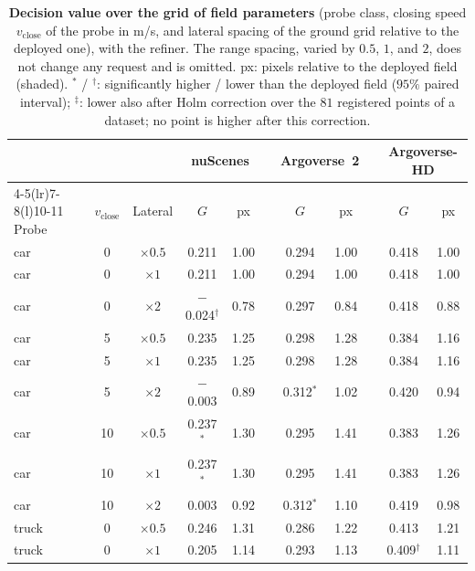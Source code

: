 \documentclass[10pt,letterpaper]{article}
\newcommand{\G}{G}
\newcommand{\vclose}{v_{\mathrm{close}}}
\newcommand{\oursrow}{\rowcolor{oursbg}}
\theoremstyle{remark}
\theoremstyle{plain}
\theoremstyle{definition}
\begin{document}
\begin{table}[!htbp]
\centering
\caption{\textbf{Decision value over the grid of field parameters} (probe class, closing speed $\vclose$ of the probe in m/s, and lateral spacing of the ground grid relative to the deployed one), with the refiner. The range spacing, varied by $0.5$, $1$, and $2$, does not change any request and is omitted. px: pixels relative to the deployed field (shaded). $^{\ast}$ / $^{\dagger}$: significantly higher / lower than the deployed field ($95\%$ paired interval); $^{\ddagger}$: lower also after Holm correction over the $81$ registered points of a dataset; no point is higher after this correction.}
\label{tab:grid}
\footnotesize
\setlength{\tabcolsep}{2.6pt}
\begin{tabular}{@{}lcccccccccc@{}}
\toprule
 & & & \multicolumn{2}{c}{nuScenes} & & \multicolumn{2}{c}{Argoverse~2} & & \multicolumn{2}{c}{Argoverse-HD} \\
\cmidrule(lr){4-5}\cmidrule(lr){7-8}\cmidrule(l){10-11}
Probe & $\vclose$ & Lateral & $\G$ & px & & $\G$ & px & & $\G$ & px \\
\midrule
car & 0 & $\times0.5$ & 0.211 & 1.00 & & 0.294 & 1.00 & & 0.418 & 1.00 \\
\oursrow car & 0 & $\times1$ & 0.211 & 1.00 & & 0.294 & 1.00 & & 0.418 & 1.00 \\
car & 0 & $\times2$ & $-$0.024$^{\dagger}$ & 0.78 & & 0.297 & 0.84 & & 0.418 & 0.88 \\
car & 5 & $\times0.5$ & 0.235 & 1.25 & & 0.298 & 1.28 & & 0.384 & 1.16 \\
car & 5 & $\times1$ & 0.235 & 1.25 & & 0.298 & 1.28 & & 0.384 & 1.16 \\
car & 5 & $\times2$ & $-$0.003 & 0.89 & & 0.312$^{\ast}$ & 1.02 & & 0.420 & 0.94 \\
car & 10 & $\times0.5$ & 0.237$^{\ast}$ & 1.30 & & 0.295 & 1.41 & & 0.383 & 1.26 \\
car & 10 & $\times1$ & 0.237$^{\ast}$ & 1.30 & & 0.295 & 1.41 & & 0.383 & 1.26 \\
car & 10 & $\times2$ & 0.003 & 0.92 & & 0.312$^{\ast}$ & 1.10 & & 0.419 & 0.98 \\
truck & 0 & $\times0.5$ & 0.246 & 1.31 & & 0.286 & 1.22 & & 0.413 & 1.21 \\
truck & 0 & $\times1$ & 0.205 & 1.14 & & 0.293 & 1.13 & & 0.409$^{\dagger}$ & 1.11 \\

\end{tabular}
\end{table}
\end{document}
